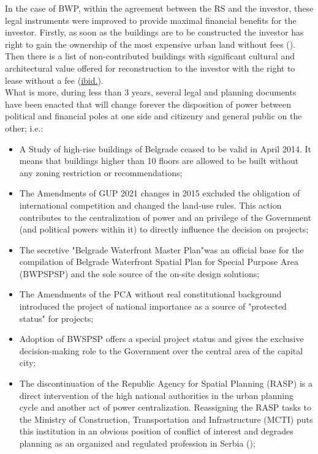 \documentclass[11pt]{report}
\begin{document}
{In the case of BWP, within the agreement between the RS and the investor, these legal instruments were improved  to provide maximal financial benefits for the investor.
Firstly, as soon as the buildings are to be constructed the investor has right to gain the ownership of the most expensive urban land without fees (\href{JVA}{\cite{JVA}}).
Then there is a list of non-contributed buildings with significant cultural and architectural value offered for reconstruction to the investor with the right to lease without a fee (\href{JVA}{ibid.}).
\\

What is more, during less than 3 years, several legal and planning documents have been enacted that will change forever the disposition of power between political and financial poles at one side and citizenry and general public on the other; i.e.:

\begin{itemize}

\item A Study of high-rise buildings of Belgrade ceased to be valid in April 2014. It means that buildings higher than 10 floors are allowed to be built without any zoning restriction or recommendations;

\item The Amendments of GUP 2021 changes in 2015 excluded the obligation of international competition and changed the land-use rules.
This action contributes to the centralization of power and an privilege of the Government (and political powers within it) to directly influence the decision on projects;

\item The secretive "Belgrade Waterfront Master Plan"was an official base for the compilation of Belgrade Waterfront Spatial Plan for Special Purpose Area (BWPSPSP) and the sole source of the on-site design solutions;

\item  The Amendments of the PCA without real constitutional background introduced the project of national importance as a source of "protected status" for projects;

\item Adoption of BWSPSP offers a special project status and gives the exclusive decision-making role to the Government over the central area of the capital city; 

\item The discontinuation of the Republic Agency for Spatial Planning (RASP) is a direct intervention of the high national authorities in the urban planning cycle and another act of power centralization.
Reassigning the RASP tasks to the Ministry of Construction, Transportation and Infrastructure (MCTI) puts this institution in an obvious position of conflict of interest and degrades  planning as an organized and regulated profession in Serbia (\href{Stojkov}{\cite{Stojkov2015}});


\end{itemize}}
\end{document}
